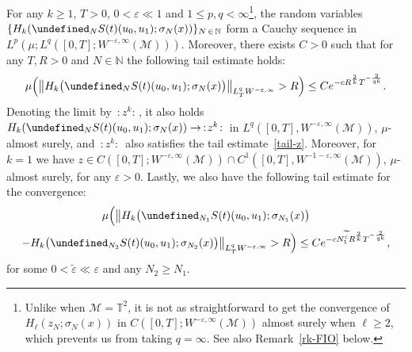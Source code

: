 \documentclass[10pt]{amsart}
\theoremstyle{definition}\newtheorem{defi}[theo]{Definition}\newtheorem{rema}[theo]{Remark}\newtheorem{exam}[theo]{Example}\newtheorem{exem}[theo]{Example}\newtheorem{nota}[theo]{Notation}
\newcommand{\T}{\mathbb{T}}
\newcommand{\N}{\mathbb{N}}
\let\P= \undefined
\newcommand{\P}{\mathbf{P}}
\newcommand{\M}{\mathcal{M}}
\newcommand{\eps}{\varepsilon}
\newcommand{\s}{\sigma}
\newcommand{\wt}{\widetilde}
\begin{document}
\begin{prop}\label{prop-z}
For any $k\geq 1$, $T>0$, $0<\eps \ll 1$ and $1\leq p,q<\infty$\footnote{Unlike when $\M=\T^2$, it is not as straightforward to get the convergence of $H_\ell(z_N;\s_N(x))$ in $C([0,T];W^{-\eps,\infty}(\M))$ almost surely when $\ell\ge 2$, which prevents us from taking $q=\infty$. See also Remark~\ref{rk-FIO} below.}, the random variables $\{H_k(\P_NS(t)(u_0,u_1);\s_N(x))\}_{N\,\in\,\N}$ form a Cauchy sequence in $L^p(\mu;L^q([0,T];W^{-\eps,\infty}(\M)))$. Moreover, there exists $C>0$ such that for any $T,R>0$ and $N\in\N$ the following tail estimate holds:
\begin{equation}\label{tail-z}
\mu\Big(\big\|H_k\big(\P_NS(t)(u_0,u_1);\s_N(x)\big)\big\|_{L^q_TW^{-\eps,\infty}}>R\Big)\leq Ce^{-cR^{\frac2k}T^{-\frac2{qk}}}.
\end{equation}
Denoting the limit by $\,:\!z^k\!:\,$, it also holds $H_k(\P_NS(t)(u_0,u_1);\s_N(x))\rightarrow \,:\!z^k\!:\,$ in $L^q([0,T],W^{-\eps,\infty}(\M))$, $\mu$-almost surely, and $\,:\!z^k\!:\,$ also satisfies the tail estimate~\eqref{tail-z}. Moreover, for $k=1$ we have $z\in C([0,T];W^{-\eps,\infty}(\M))\cap C^1([0,T],W^{-1-\eps,\infty}(\M)) $, $\mu$-almost surely, for any $\eps>0$. Lastly, we also have the following tail estimate for the convergence:
\begin{multline}\label{tail-z-zN}
\mu\Big(\big\|H_k\big(\P_{N_1}S(t)(u_0,u_1);\s_{N_1}(x)\big)\\
-H_k\big(\P_{N_2}S(t)(u_0,u_1);\s_{N_2}(x)\big)\big\|_{L^q_TW^{-\eps,\infty}}
>R\Big)\leq Ce^{-cN_1^{\widetilde{\eps}}R^{\frac2k}T^{-\frac2{qk}}},
\end{multline}
for some $0<\wt\eps\ll\eps$ and any $N_2\ge N_1$.
\end{prop}
\end{document}
